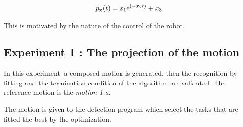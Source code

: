 \documentclass[letterpaper, 10pt, conference]{ieeeconf}      %
\begin{document}
\begin{equation}
p_{{\mathbf{x}}}(t) = x_1 \mathrm{e}^{(-x_2 t)} + x_3
\label{eqTask}
\end{equation}

This is motivated by the nature of the control of the
robot.\\

\subsection{Experiment 1 : The projection of the motion}
In this experiment, a composed motion is generated, then the recognition by fitting
and the termination condition of the algorithm are validated.
The reference motion is the \emph{motion 1.a}.

The motion is given to the detection program
which select the tasks that are fitted the best by the optimization.
\end{document}
